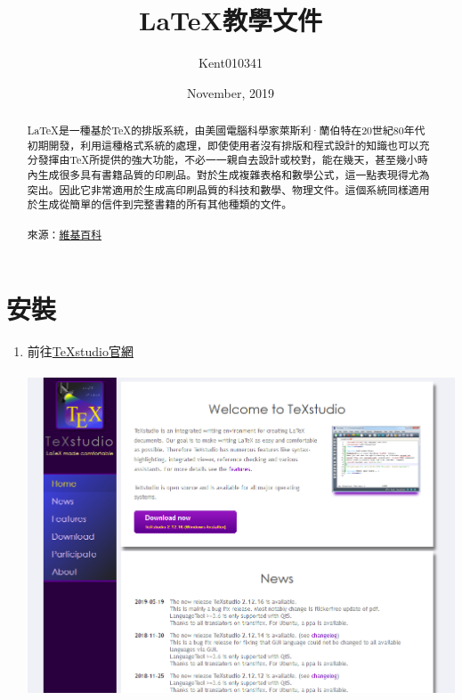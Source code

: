 \documentclass[12pt]{article}
\title{LaTeX教學文件}
\author{Kent010341}
\date{November, 2019}
\begin{document}
	\begin{CJK*}{UTF8}{bsmi}
		\begin{titlepage}
			\maketitle
		\end{titlepage}
		\renewcommand{\contentsname}{目錄}
		\tableofcontents
		\newpage
		
		\renewcommand{\abstractname}{摘要}
		\begin{abstract}
			\hspace{25pt}LaTeX是一種基於TeX的排版系統，由美國電腦科學家萊斯利·蘭伯特在20世紀80年代初期開發，利用這種格式系統的處理，即使使用者沒有排版和程式設計的知識也可以充分發揮由TeX所提供的強大功能，不必一一親自去設計或校對，能在幾天，甚至幾小時內生成很多具有書籍品質的印刷品。對於生成複雜表格和數學公式，這一點表現得尤為突出。因此它非常適用於生成高印刷品質的科技和數學、物理文件。這個系統同樣適用於生成從簡單的信件到完整書籍的所有其他種類的文件。 \\
			\\
			來源：\href{https://zh.wikipedia.org/wiki/LaTeX}{維基百科}
		\end{abstract}
		\newpage
		
		\section{安裝}
			\begin{enumerate}[1.]
				\item 前往\href{https://www.texstudio.org/}{TeXstudio官網} \\ \\
				\includegraphics[scale=0.7]{TeXStudio_mainpage}
				

\end{enumerate}
\end{CJK*}
\end{document}
